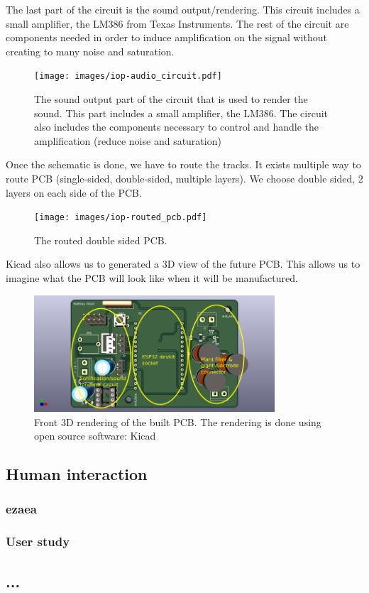 The last part of the circuit is the sound output/rendering. This circuit includes a small amplifier,
the LM386 from Texas Instruments. The rest of the circuit are components needed in order to 
induce amplification on the signal without creating to many noise and saturation.

\begin{figure}[h!]
    \centering
    \texttt{[image: images/iop-audio\_circuit.pdf]}
    \caption{The sound output part of the circuit that is used to render the sound. 
    This part includes a small amplifier, the LM386. The circuit also includes the components necessary
    to control and handle the amplification (reduce noise and saturation)} 
    \vspace{0.1cm}
    \label{fig:iop_schematic_audio}
\end{figure}


Once the schematic is done, we have to route the tracks. It exists multiple way to route PCB 
(single-sided, double-sided, multiple layers). We choose double sided, 2 layers on each side of the PCB.

\begin{figure}[h!]
    \centering
    \texttt{[image: images/iop-routed\_pcb.pdf]}
    \caption{The routed double sided PCB.} 
    \vspace{0.1cm}
    \label{fig:iop_routed_pcb}
\end{figure}

Kicad also allows us to generated a 3D view of the future PCB. This allows us to imagine what the
PCB will look like when it will be manufactured.
\begin{figure}[h!]
    \centering
    \includegraphics[width=0.8\textwidth]{images/front_iop_3D_view_modified.png}
    \caption{Front 3D rendering of the built PCB. The rendering is done using open source software: Kicad} 
    \vspace{0.1cm}
    \label{fig:front_iop_3D_view_modified}
\end{figure}

\subsection{Human interaction}
\subsubsection{ezaea}
\newpage
\subsubsection{User study}

\subsection{...}